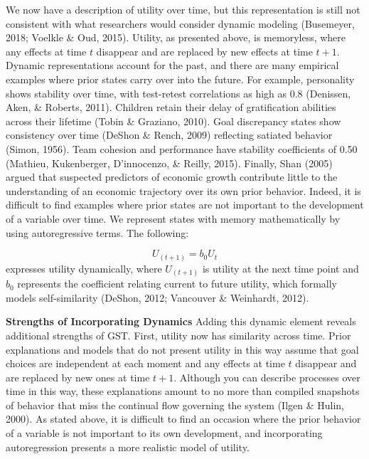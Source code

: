\documentclass[english,,man]{apa6}
\theoremstyle{definition}
\theoremstyle{definition}
\theoremstyle{definition}
\theoremstyle{remark}
\begin{document}
We now have a description of utility over time, but this representation
is still not consistent with what researchers would consider dynamic
modeling (Busemeyer, 2018; Voelkle \& Oud, 2015). Utility, as presented
above, is memoryless, where any effects at time \(t\) disappear and are
replaced by new effects at time \(t+1\). Dynamic representations account
for the past, and there are many empirical examples where prior states
carry over into the future. For example, personality shows stability
over time, with test-retest correlations as high as 0.8 (Denissen, Aken,
\& Roberts, 2011). Children retain their delay of gratification
abilities across their lifetime (Tobin \& Graziano, 2010). Goal
discrepancy states show consistency over time (DeShon \& Rench, 2009)
reflecting satiated behavior (Simon, 1956). Team cohesion and
performance have stability coefficients of 0.50 (Mathieu, Kukenberger,
D'innocenzo, \& Reilly, 2015). Finally, Shan (2005) argued that
suspected predictors of economic growth contribute little to the
understanding of an economic trajectory over its own prior behavior.
Indeed, it is difficult to find examples where prior states are not
important to the development of a variable over time. We represent
states with memory mathematically by using autoregressive terms. The
following:

\begin{equation}
U_{(t+1)} = b_0 U_{t}
\end{equation} \noindent expresses utility dynamically, where
\(U_{(t+1)}\) is utility at the next time point and \(b_0\) represents
the coefficient relating current to future utility, which formally
models self-similarity (DeShon, 2012; Vancouver \& Weinhardt, 2012).

\textbf{Strengths of Incorporating Dynamics} Adding this dynamic element
reveals additional strengths of GST. First, utility now has similarity
across time. Prior explanations and models that do not present utility
in this way assume that goal choices are independent at each moment and
any effects at time \(t\) disappear and are replaced by new ones at time
\(t+1\). Although you can describe processes over time in this way,
these explanations amount to no more than compiled snapshots of behavior
that miss the continual flow governing the system (Ilgen \& Hulin,
2000). As stated above, it is difficult to find an occasion where the
prior behavior of a variable is not important to its own development,
and incorporating autoregression presents a more realistic model of
utility.
\end{document}
